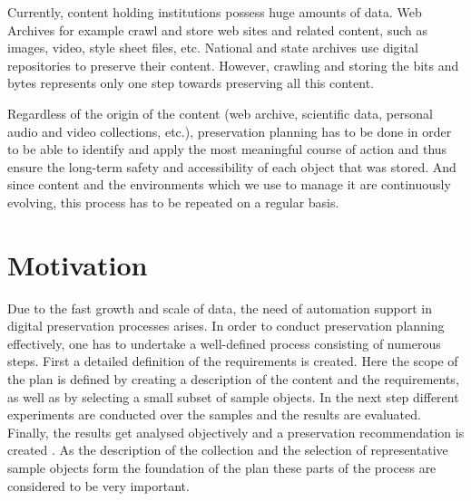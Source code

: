 Currently, content holding institutions possess huge amounts of data. Web Archives for example crawl and store web sites and related content, such as images, video, style sheet files, etc. National and state archives use digital repositories to preserve their content. However, crawling and storing the bits and bytes represents only one step towards preserving all this content.

Regardless of the origin of the content (web archive, scientific data, personal audio and video collections, etc.), preservation planning has to be done in order to be able to identify and apply the most meaningful course of action and thus ensure the long-term safety and accessibility of each object that was stored. And since content and the environments which we use to manage it are continuously evolving, this process has to be repeated on a regular basis.

\section{Motivation}
\label{sec:motivation}
Due to the fast growth and scale of data, the need of automation support in digital preservation processes arises. In order to conduct preservation planning effectively, one has to undertake a well-defined process consisting of numerous steps. First a detailed definition of the requirements is created. Here the scope of the plan is defined by creating a description of the content and the requirements, as well as by selecting a small subset of sample objects. In the next step different experiments are conducted over the samples and the results are evaluated. Finally, the results get analysed objectively and a preservation recommendation is created \cite{Becker:2009fk}. As the description of the collection and the selection of representative sample objects form the foundation of the plan these parts of the process are considered to be very important.

